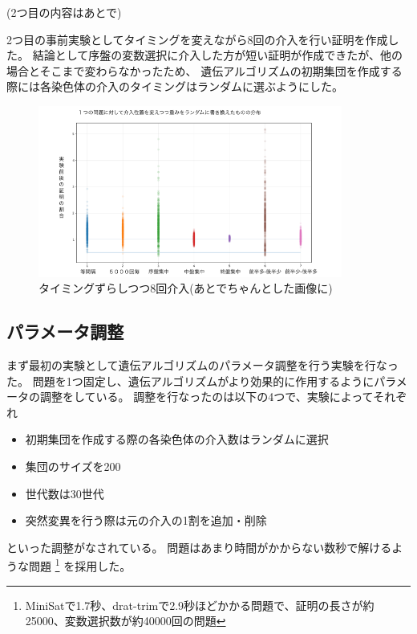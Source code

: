 
(2つ目の内容はあとで)

2つ目の事前実験としてタイミングを変えながら8回の介入を行い証明を作成した。
結論として序盤の変数選択に介入した方が短い証明が作成できたが、他の場合とそこまで変わらなかったため、
遺伝アルゴリズムの初期集団を作成する際には各染色体の介入のタイミングはランダムに選ぶようにした。

\begin{figure}[h]
    \centering
    \includegraphics[width=10cm]{figures/Experiment0/1.png}
    \caption{タイミングずらしつつ8回介入(あとでちゃんとした画像に)}
\end{figure}





\subsection{パラメータ調整}%



まず最初の実験として遺伝アルゴリズムのパラメータ調整を行う実験を行なった。
問題を1つ固定し、遺伝アルゴリズムがより効果的に作用するようにパラメータの調整をしている。
調整を行なったのは以下の4つで、実験によってそれぞれ
\begin{itemize}
    \item 初期集団を作成する際の各染色体の介入数はランダムに選択
    \item 集団のサイズを200
    \item 世代数は30世代
    \item 突然変異を行う際は元の介入の1割を追加・削除
\end{itemize}
といった調整がなされている。
問題はあまり時間がかからない数秒で解けるような問題
\footnote{MiniSatで1.7秒、drat-trimで2.9秒ほどかかる問題で、証明の長さが約25000、変数選択数が約40000回の問題}
を採用した。



